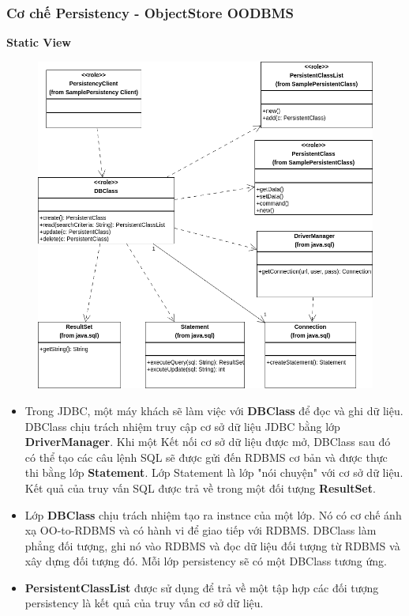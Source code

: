 \subsubsection{Cơ chế Persistency - ObjectStore OODBMS}
\textbf{Static View}
\begin{figure}[H]
    \centering
    \includegraphics[width=0.95\linewidth]{img3.1.2/design mechanism-Persistency.drawio.png}
\end{figure}
\begin{itemize}
    \item Trong JDBC, một máy khách sẽ làm việc với \textbf{DBClass} để đọc và ghi dữ liệu. DBClass chịu trách nhiệm truy cập cơ sở dữ liệu JDBC bằng lớp \textbf{DriverManager}. Khi một Kết nối cơ sở dữ liệu được mở, DBClass sau đó có thể tạo các câu lệnh SQL sẽ được gửi đến RDBMS cơ bản và được thực thi bằng lớp \textbf{Statement}. Lớp Statement là lớp "nói chuyện" với cơ sở dữ liệu. Kết quả của truy vấn SQL được trả về trong một đối tượng \textbf{ResultSet}.
    \item Lớp \textbf{DBClass} chịu trách nhiệm tạo ra instnce của một lớp. Nó có cơ chế ánh xạ OO-to-RDBMS và có hành vi để giao tiếp với RDBMS. DBClass làm phẳng đối tượng, ghi nó vào RDBMS và đọc dữ liệu đối tượng từ RDBMS và xây dựng đối tượng đó. Mỗi lớp persistency sẽ có một DBClass tương ứng.
    \item \textbf{PersistentClassList} được sử dụng để trả về một tập hợp các đối tượng persistency là kết quả của truy vấn cơ sở dữ liệu.
\end{itemize}

